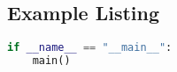 \begin{appendices}

\section{Example Listing} \label{app:example}

\begin{lstlisting}[language=python,caption={main.py},captionpos=b]
if __name__ == "__main__":
    main()

\end{lstlisting}

\end{appendices}